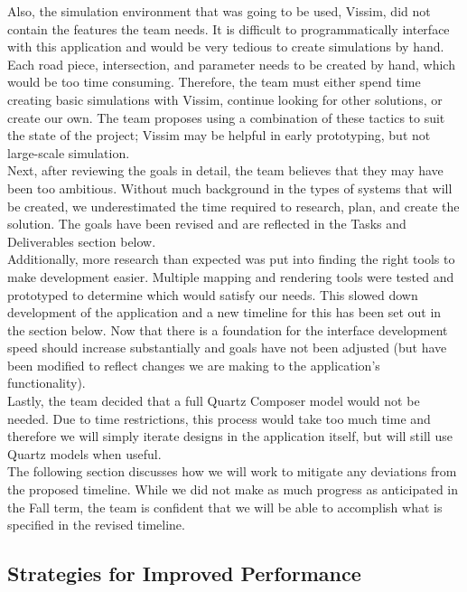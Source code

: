 \documentclass{article}
\begin{document}
Also, the simulation environment that was going to be used, Vissim, did not contain the features the team needs.
It is difficult to programmatically interface with this application and would be very tedious to create simulations by hand.
Each road piece, intersection, and parameter needs to be created by hand, which would be too time consuming.
Therefore, the team must either spend time creating basic simulations with Vissim, continue looking for other solutions, or create our own.
The team proposes using a combination of these tactics to suit the state of the project; Vissim may be helpful in early prototyping, but not large-scale simulation.\\

Next, after reviewing the goals in detail, the team believes that they may have been too ambitious.
Without much background in the types of systems that will be created, we underestimated the time required to research, plan, and create the solution.
The goals have been revised and are reflected in the Tasks and Deliverables section below.\\

Additionally, more research than expected was put into finding the right tools to make development easier.
Multiple mapping and rendering tools were tested and prototyped to determine which would satisfy our needs.
This slowed down development of the application and a new timeline for this has been set out in the section below.
Now that there is a foundation for the interface development speed should increase substantially and goals have not been adjusted (but have been modified to reflect changes we are making to the application's functionality).\\

Lastly, the team decided that a full Quartz Composer model would not be needed.
Due to time restrictions, this process would take too much time and therefore we will simply iterate designs in the application itself, but will still use Quartz models when useful.\\

The following section discusses how we will work to mitigate any deviations from the proposed timeline.
While we did not make as much progress as anticipated in the Fall term, the team is confident that we will be able to accomplish what is specified in the revised timeline.\\

\subsection{Strategies for Improved Performance}
\end{document}
